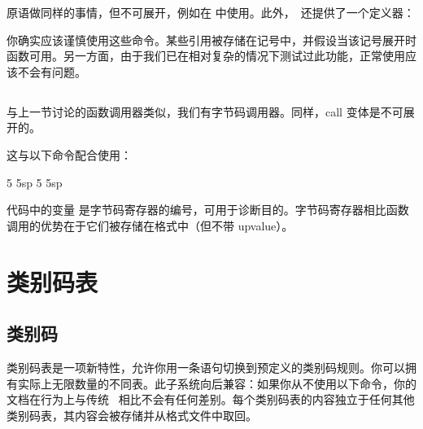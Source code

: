 \begin{typing}
\end{typing}

 原语做同样的事情，但不可展开，例如在  中使用。此外，\LUATEX\ 还提供了一个定义器：


你确实应该谨慎使用这些命令。某些引用被存储在记号中，并假设当该记号展开时函数可用。另一方面，由于我们已在相对复杂的情况下测试过此功能，正常使用应该不会有问题。

\subsection{}

与上一节讨论的函数调用器类似，我们有字节码调用器。同样，call 变体是不可展开的。

\begin{typing}
\end{typing}

这与以下命令配合使用：

\begin{typing}
 5   5sp
 5   5sp
\end{typing}

代码中的变量  是字节码寄存器的编号，可用于诊断目的。字节码寄存器相比函数调用的优势在于它们被存储在格式中（但不带 upvalue）。

\section{类别码表}

\subsection{类别码}


类别码表是一项新特性，允许你用一条语句切换到预定义的类别码规则。你可以拥有实际上无限数量的不同表。此子系统向后兼容：如果你从不使用以下命令，你的文档在行为上与传统 \TEX\ 相比不会有任何差别。每个类别码表的内容独立于任何其他类别码表，其内容会被存储并从格式文件中取回。

